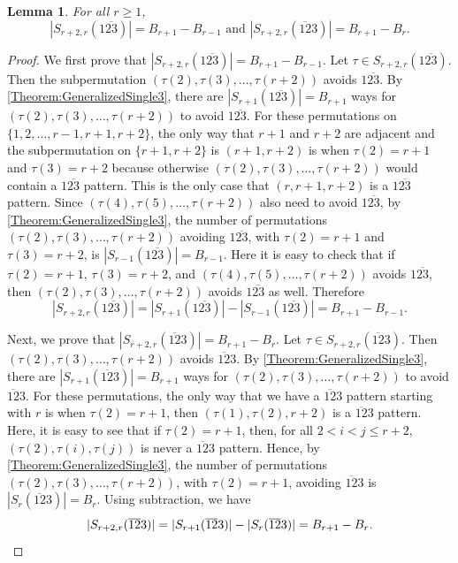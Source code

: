 \documentclass[11pt]{article}
\newtheorem{lemma}[theorem]{Lemma}
\theoremstyle{definition}
\numberwithin{equation}{section}
\begin{document}
\begin{lemma}
For all $r\geq1$, \[|S_{r+2,r}(1\overline{23})|=B_{r+1}-B_{r-1} \text{ and } |S_{r+2,r}(\overline{12}3)|=B_{r+1}-B_{r}.\]
\end{lemma}
\begin{proof}
We first prove that $|S_{r+2,r}(1\overline{23})|=B_{r+1}-B_{r-1}$. Let $\tau\in S_{r+2,r}(1\overline{23})$. Then the subpermutation $(\tau(2),\tau(3),\ldots,\tau(r+2))$ avoids $1\overline{23}$. By \cref{Theorem:GeneralizedSingle3}, there are $|S_{r+1}(1\overline{23})|=B_{r+1}$ ways for $(\tau(2),\tau(3),\ldots,\tau(r+2))$ to avoid $1\overline{23}$. For these permutations on $\{1,2,\ldots,r-1,r+1,r+2\}$, the only way that $r+1$ and $r+2$ are adjacent and the subpermutation on $\{r+1,r+2\}$ is $(r+1,r+2)$ is when $\tau(2)=r+1$ and $\tau(3)=r+2$ because otherwise $(\tau(2),\tau(3),\ldots,\tau(r+2))$ would contain a $1\overline{23}$ pattern. This is the only case that $(r,r+1,r+2)$ is a $1\overline{23}$ pattern. Since $(\tau(4),\tau(5),\ldots,\tau(r+2))$ also need to avoid $1\overline{23}$, by \cref{Theorem:GeneralizedSingle3}, the number of permutations $(\tau(2),\tau(3),\ldots,\tau(r+2))$ avoiding $1\overline{23}$, with $\tau(2)=r+1$ and $\tau(3)=r+2$, is $|S_{r-1}(1\overline{23})|=B_{r-1}$. Here it is easy to check that if $\tau(2)=r+1$, $\tau(3)=r+2$, and $(\tau(4),\tau(5),\ldots,\tau(r+2))$ avoids $1\overline{23}$, then $(\tau(2),\tau(3),\ldots,\tau(r+2))$ avoids $1\overline{23}$ as well. 
Therefore
\[
|S_{r+2,r}(1\overline{23})|=|S_{r+1}(1\overline{23})|-|S_{r-1}(1\overline{23})|=B_{r+1}-B_{r-1}.
\]

Next, we prove that $|S_{r+2,r}(\overline{12}3)|=B_{r+1}-B_r$. Let $\tau\in S_{r+2,r}(\overline{12}3)$. Then $(\tau(2),\tau(3),\ldots,\tau(r+2))$ avoids $\overline{12}3$. By \cref{Theorem:GeneralizedSingle3}, there are $|S_{r+1}(\overline{12}3)|=B_{r+1}$ ways for $(\tau(2),\tau(3),\ldots,\tau(r+2))$ to avoid $\overline{12}3$. For these permutations, the only way that we have a $\overline{12}3$ pattern starting with $r$ is when $\tau(2)=r+1$, then $(\tau(1),\tau(2),r+2)$ is a $\overline{12}3$ pattern. Here, it is easy to see that if $\tau(2)=r+1$, then, for all $2<i<j\leq r+2$, $(\tau(2),\tau(i),\tau(j))$ is never a $\overline{12}3$ pattern. Hence, by \cref{Theorem:GeneralizedSingle3}, the number of permutations $(\tau(2),\tau(3),\ldots,\tau(r+2))$, with $\tau(2)=r+1$, avoiding $\overline{12}3$ is $|S_{r}(\overline{12}3)|=B_r$. Using subtraction, we have
\[
|S_{r+2,r}(\overline{12}3)|=|S_{r+1}(\overline{12}3)|-|S_{r}(\overline{12}3)|=B_{r+1}-B_{r}.\qedhere
\]
\end{proof}
\end{document}
